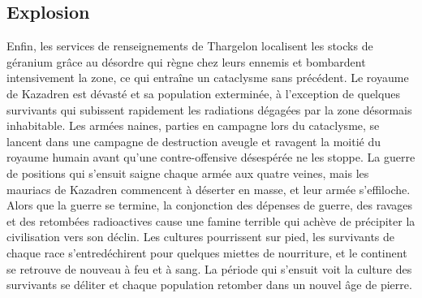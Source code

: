 \subsection{Explosion}
Enfin, les services de renseignements de Thargelon localisent les stocks de géranium grâce au désordre qui règne chez leurs ennemis et bombardent intensivement la zone, ce qui entraîne un cataclysme sans précédent. Le royaume de Kazadren est dévasté et sa population exterminée, à l'exception de quelques survivants qui subissent rapidement les radiations dégagées par la zone désormais inhabitable. Les armées naines, parties en campagne lors du cataclysme, se lancent dans une campagne de destruction aveugle et ravagent la moitié du royaume humain avant qu'une contre-offensive désespérée ne les stoppe. La guerre de positions qui s'ensuit saigne chaque armée aux quatre veines, mais les mauriacs de Kazadren commencent à déserter en masse, et leur armée s'effiloche. 
\newline
Alors que la guerre se termine, la conjonction des dépenses de guerre, des ravages et des retombées radioactives cause une famine terrible qui achève de précipiter la civilisation vers son déclin. Les cultures pourrissent sur pied, les survivants de chaque race s'entredéchirent pour quelques miettes de nourriture, et le continent se retrouve de nouveau à feu et à sang. La période qui s'ensuit voit la culture des survivants se déliter et chaque population retomber dans un nouvel âge de pierre.
